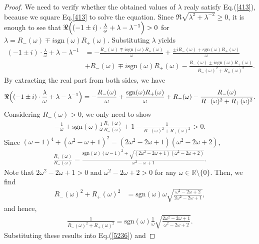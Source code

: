 \documentclass[a4paper,12pt]{article}
\theoremstyle{plain}
\theoremstyle{definition}
\theoremstyle{definition}
\begin{document}
\begin{proof}
We need to verify whether the obtained values of $\lambda$ realy satisfy Eq.(\ref{413}), 
because we square Eq.\eqref{413} to solve the equation. Since $\Re \sqrt{\lambda^2 +\lambda^{-2}} \ge 0$, it is enough to see that $\Re \Bigl( (-1\pm i) \cdot \frac{\lambda}{\omega}+\lambda -\lambda^{-1} \Bigr) > 0$ for $\lambda = R_-(\omega) \mp i\mathrm{sgn}(\omega) R_+(\omega)$. 
Substituting $\lambda$ yields 
\begin{align*}
    (-1 \pm i) \cdot \frac{\lambda}{\omega} +\lambda -\lambda^{-1} &= -\frac{R_-(\omega)\mp i\mathrm{sgn}(\omega)R_+(\omega)}{\omega} + \frac{\pm iR_-(\omega) + \mathrm{sgn}(\omega)R_+(\omega)}{\omega}\\
    &+R_-(\omega)\mp i\mathrm{sgn}(\omega)R_+(\omega)-\frac{R_-(\omega)\pm i\mathrm{sgn}(\omega)R_+(\omega)}{R_-(\omega)^2 +R_+(\omega)^2}.
\end{align*}
By extracting the real part from both sides, we have
\begin{align*}
    \Re \Bigl( (-1\pm i) \cdot \frac{\lambda}{\omega} +\lambda -\lambda^{-1} \Bigr) =-\frac{R_-(\omega)}{\omega}+\frac{\mathrm{sgn}(\omega)R_+(\omega)}{\omega}+R_-(\omega) -\frac{R_-(\omega)}{R_-(\omega)^2+R_+(\omega)^2}.
\end{align*}
Considering $R_-(\omega) >0$, we only need to show
\begin{align}
    -\frac{1}{\omega}+ \mathrm{sgn}(\omega)\frac{1}{\omega}\frac{R_+(\omega)}{R_-(\omega)}+1 - \frac{1}{R_-(\omega)^2+R_+(\omega)^2} > 0. \label{5236}
\end{align}
Since $(\omega -1)^4+(\omega^2-\omega+1)^2=(2\omega^2-2\omega+1)(\omega^2-2\omega+2)$,
\begin{align*}
    \frac{R_+(\omega)}{R_-(\omega)} = \frac{\mathrm{sgn}(\omega)(\omega -1)^2 +\sqrt{(2\omega ^2 -2\omega +1)(\omega ^2 -2\omega +2)}}{\omega^2 -\omega +1}.
\end{align*}
Note that $2\omega^2 - 2\omega + 1 > 0$ and $\omega^2 - 2\omega + 2 > 0$ for any $\omega \in \mathbb{R} \setminus \{0\}$. Then, we find
\begin{align*}
R_-(\omega)^2+R_+(\omega)^2 &= \mathrm{sgn}(\omega) \omega \sqrt{\frac{\omega^2-2\omega +2}{2\omega^2 -2\omega +1}},
\end{align*}
and hence,
\begin{align*}
    \frac{1}{R_-(\omega)^2+R_+(\omega)^2} =\mathrm{sgn}(\omega)\frac{1}{\omega}\sqrt{\frac{2\omega^2 -2\omega +1}{\omega^2 -2\omega +2}}.
\end{align*}
Substituting these results into Eq.(\ref{5236}) and

\end{proof}
\end{document}
